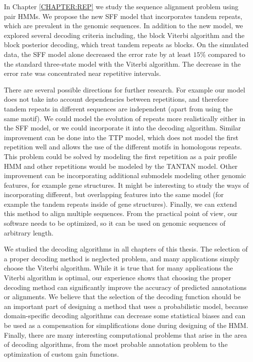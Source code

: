 In Chapter \ref{CHAPTER:REP} we study the sequence alignment problem using pair
HMMs. We propose the new SFF model that incorporates tandem repeats, which are
prevalent in the genomic sequences. In addition to the new model, we explored
several decoding criteria including, the block Viterbi algorithm and the block
posterior decoding, which treat tandem repeats as blocks. On the simulated data,
the SFF model alone decreased the error rate by at least $15\%$  compared to
the standard three-state model with the Viterbi algorithm. The decrease in the
error rate was  concentrated near repetitive intervals. 

There are several possible directions for further research. For example our
model does not take into account dependencies between repetitions, and therefore
tandem repeats in different sequences are independent (apart from using the same
motif). We could model the evolution of repeats more realistically either in
the SFF model, or we could incorporate it into the decoding algorithm.  Similar improvement can be done
into the TTP model, which does not model the first repetition well and allows the
use of the different motifs in homologous repeats. This problem could be solved
by modeling the first repetition as a pair profile HMM and other repetitions
would be modeled by the TANTAN model.  Other improvement can be incorporating
additional submodels modeling other genomic features, for example gene structures. It
might be interesting to study the ways of incorporating different, but
overlapping features into the same model (for example the tandem repeats inside
of gene structures).  Finally, we can extend this method to align multiple
sequences. From the practical point of view, our software needs to be
optimized, so it can be used on genomic sequences of arbitrary length.

We studied the decoding algorithms in all chapters of this thesis.
The selection of a proper decoding method is neglected 
problem, and many applications simply choose the Viterbi algorithm. While it is
true that for many applications the Viterbi algorithm is optimal,  our
experience shows that choosing the proper decoding method can significantly
improve the accuracy of predicted annotations or alignments. We believe
that the selection of the decoding function should be an important part of
designing a method that uses a probabilistic model, because domain-specific
decoding algorithms can decrease some statistical biases and can be used as a
compensation for simplifications done during designing of the HMM. Finally,
there are many interesting computational problems that arise in the area of decoding
algorithms, from the most probable annotation problem to the optimization of
custom gain functions.

\label{LastPage}
